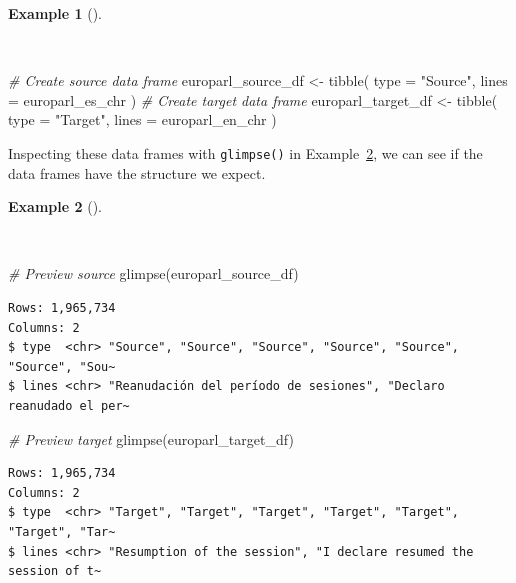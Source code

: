 \documentclass[
  letterpaper,
]{book}
\newenvironment{Shaded}{\begin{snugshade}}{\end{snugshade}}
\newcommand{\AttributeTok}[1]{\textcolor[rgb]{0.00,0.00,0.00}{#1}}
\newcommand{\CommentTok}[1]{\textcolor[rgb]{0.00,0.00,0.00}{\textit{#1}}}
\newcommand{\FunctionTok}[1]{\textcolor[rgb]{0.00,0.00,0.00}{#1}}
\newcommand{\NormalTok}[1]{\textcolor[rgb]{0.00,0.00,0.00}{#1}}
\newcommand{\OtherTok}[1]{\textcolor[rgb]{0.00,0.00,0.00}{#1}}
\newcommand{\StringTok}[1]{\textcolor[rgb]{0.00,0.00,0.00}{#1}}
\theoremstyle{definition}
\newtheorem{example}{Example}[chapter]
\theoremstyle{remark}
\begin{document}
\begin{example}[]\protect\hypertarget{exm-curate-europarl-df}{}\label{exm-curate-europarl-df}

~

\begin{Shaded}
\begin{Highlighting}[]
\CommentTok{\# Create source data frame}
\NormalTok{europarl\_source\_df }\OtherTok{\textless{}{-}}
  \FunctionTok{tibble}\NormalTok{(}
    \AttributeTok{type =} \StringTok{"Source"}\NormalTok{,}
    \AttributeTok{lines =}\NormalTok{ europarl\_es\_chr}
\NormalTok{  )}
\CommentTok{\# Create target data frame}
\NormalTok{europarl\_target\_df }\OtherTok{\textless{}{-}}
  \FunctionTok{tibble}\NormalTok{(}
    \AttributeTok{type =} \StringTok{"Target"}\NormalTok{,}
    \AttributeTok{lines =}\NormalTok{ europarl\_en\_chr}
\NormalTok{  )}
\end{Highlighting}
\end{Shaded}

\end{example}

Inspecting these data frames with \texttt{glimpse()} in
Example~\ref{exm-curate-europarl-glimpse}, we can see if the data frames
have the structure we expect.

\begin{example}[]\protect\hypertarget{exm-curate-europarl-glimpse}{}\label{exm-curate-europarl-glimpse}

~

\begin{Shaded}
\begin{Highlighting}[]
\CommentTok{\# Preview source}
\FunctionTok{glimpse}\NormalTok{(europarl\_source\_df)}
\end{Highlighting}
\end{Shaded}

\begin{verbatim}
Rows: 1,965,734
Columns: 2
$ type  <chr> "Source", "Source", "Source", "Source", "Source", "Source", "Sou~
$ lines <chr> "Reanudación del período de sesiones", "Declaro reanudado el per~
\end{verbatim}

\begin{Shaded}
\begin{Highlighting}[]
\CommentTok{\# Preview target}
\FunctionTok{glimpse}\NormalTok{(europarl\_target\_df)}
\end{Highlighting}
\end{Shaded}

\begin{verbatim}
Rows: 1,965,734
Columns: 2
$ type  <chr> "Target", "Target", "Target", "Target", "Target", "Target", "Tar~
$ lines <chr> "Resumption of the session", "I declare resumed the session of t~
\end{verbatim}

\end{example}
\end{document}
